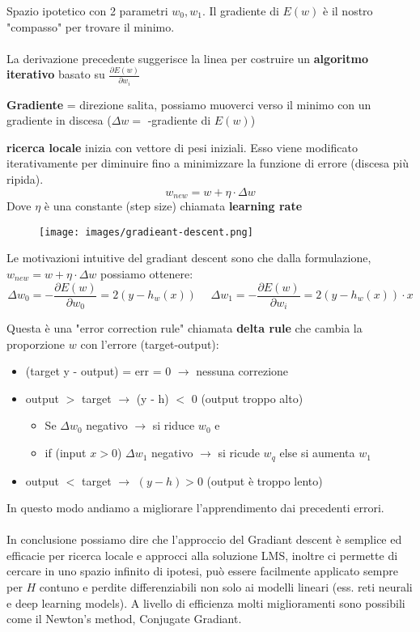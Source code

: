 \hspace{-15pt}Spazio ipotetico con 2 parametri $w_0, w_1$. Il gradiente di $E(w)$ è il nostro "compasso" per trovare il minimo.\\\\
La derivazione precedente suggerisce la linea per costruire un \textbf{algoritmo iterativo} basato su $\frac{\partial E(w)}{\partial w_i}$
\begin{definition}
    \textbf{Gradiente} = direzione salita, possiamo muoverci verso il minimo con un gradiente in discesa ($\Delta w =$ -gradiente di $E(w)$)
\end{definition}
\begin{definition}
    \textbf{ricerca locale} inizia con vettore di pesi iniziali. Esso viene modificato iterativamente per diminuire
    fino a minimizzare la funzione di errore (discesa più ripida).
    $$w_{new} = w + \eta \cdot \Delta w$$
    Dove $\eta$ è una constante (step size) chiamata \textbf{learning rate}
\end{definition}
\begin{figure}[h!]
    \centering
    \texttt{[image: images/gradieant-descent.png]}
\end{figure}
Le motivazioni intuitive del gradiant descent sono che dalla formulazione, $w_{new} = w + \eta \cdot \Delta w$ possiamo ottenere:
$$\Delta w_0 = -\frac{\partial E(w)}{\partial w_0} = 2(y- h_w(x)) \hspace{15pt} \Delta w_1 = -\frac{\partial E(w)}{\partial w_i} = 2(y - h_w(x)) \cdot x$$
\begin{definition}
    Questa è una "error correction rule" chiamata \textbf{delta rule} che cambia la proporzione $w$ con l'errore (target-output):
    \begin{itemize}
        \item (target y - output) = err  = 0 $\to$ nessuna correzione 
        \item output $>$ target $\to$ (y - h) $<$ 0 (output troppo alto)
        \begin{itemize}
            \item Se $\Delta w_0$ negativo $\to$ si riduce $w_0$ e 
            \item if (input $x > 0$) $\Delta w_1$ negativo $\to$ si ricude $w_q$ else si aumenta $w_1$
        \end{itemize}
        \item output $<$ target $\to$ $(y - h) > 0$ (output è troppo lento)
    \end{itemize} 
\end{definition}
\hspace{-15pt}In questo modo andiamo a migliorare l'apprendimento dai precedenti errori.\\\\
In conclusione possiamo dire che l'approccio del Gradiant descent è semplice ed efficacie per ricerca locale e approcci alla soluzione LMS, inoltre
ci permette di cercare in uno spazio infinito di ipotesi, può essere facilmente applicato sempre per $H$ contuno e perdite differenziabili non solo ai modelli lineari
(ess. reti neurali e deep learning models). A livello di efficienza molti miglioramenti sono possibili come il Newton's method, Conjugate Gradiant.

